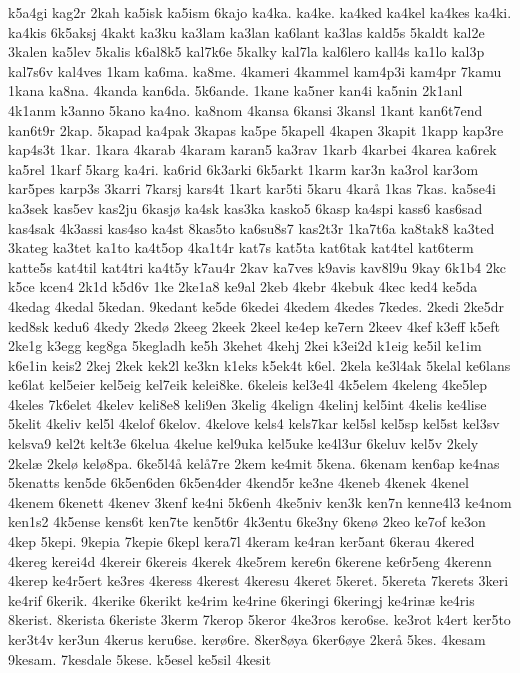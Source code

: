 {k5a4gi
kag2r
2kah
ka5isk
ka5ism
6kajo
ka4ka.
ka4ke.
ka4ked
ka4kel
ka4kes
ka4ki.
ka4kis
6k5aksj
4kakt
ka3ku
ka3lam
ka3lan
ka6lant
ka3las
kald5s
5kaldt
kal2e
3kalen
ka5lev
5kalis
k6al8k5
kal7k6e
5kalky
kal7la
kal6lero
kall4s
ka1lo
kal3p
kal7s6v
kal4ves
1kam
ka6ma.
ka8me.
4kameri
4kammel
kam4p3i
kam4pr
7kamu
1kana
ka8na.
4kanda
kan6da.
5k6ande.
1kane
ka5ner
kan4i
ka5nin
2k1anl
4k1anm
k3anno
5kano
ka4no.
ka8nom
4kansa
6kansi
3kansl
1kant
kan6t7end
kan6t9r
2kap.
5kapad
ka4pak
3kapas
ka5pe
5kapell
4kapen
3kapit
1kapp
kap3re
kap4s3t
1kar.
1kara
4karab
4karam
karan5
ka3rav
1karb
4karbei
4karea
ka6rek
ka5rel
1karf
5karg
ka4ri.
ka6rid
6k3arki
6k5arkt
1karm
kar3n
ka3rol
kar3om
kar5pes
karp3s
3karri
7karsj
kars4t
1kart
kar5ti
5karu
4karå
1kas
7kas.
ka5se4i
ka3sek
kas5ev
kas2ju
6kasjø
ka4sk
kas3ka
kasko5
6kasp
ka4spi
kass6
kas6sad
kas4sak
4k3assi
kas4so
ka4st
8kas5to
ka6su8s7
kas2t3r
1ka7t6a
ka8tak8
ka3ted
3kateg
ka3tet
ka1to
ka4t5op
4ka1t4r
kat7s
kat5ta
kat6tak
kat4tel
kat6term
katte5s
kat4til
kat4tri
ka4t5y
k7au4r
2kav
ka7ves
k9avis
kav8l9u
9kay
6k1b4
2kc
k5ce
kcen4
2k1d
k5d6v
1ke
2ke1a8
ke9al
2keb
4kebr
4kebuk
4kec
ked4
ke5da
4kedag
4kedal
5kedan.
9kedant
ke5de
6kedei
4kedem
4kedes
7kedes.
2kedi
2ke5dr
ked8sk
kedu6
4kedy
2kedø
2keeg
2keek
2keel
ke4ep
ke7ern
2keev
4kef
k3eff
k5eft
2ke1g
k3egg
keg8ga
5kegladh
ke5h
3kehet
4kehj
2kei
k3ei2d
k1eig
ke5il
ke1im
k6e1in
keis2
2kej
2kek
kek2l
ke3kn
k1eks
k5ek4t
k6el.
2kela
ke3l4ak
5kelal
ke6lans
ke6lat
kel5eier
kel5eig
kel7eik
kelei8ke.
6keleis
kel3e4l
4k5elem
4keleng
4ke5lep
4keles
7k6elet
4kelev
keli8e8
keli9en
3kelig
4kelign
4kelinj
kel5int
4kelis
ke4lise
5kelit
4keliv
kel5l
4kelof
6kelov.
4kelove
kels4
kels7kar
kel5sl
kel5sp
kel5st
kel3sv
kelsva9
kel2t
kelt3e
6kelua
4kelue
kel9uka
kel5uke
ke4l3ur
6keluv
kel5v
2kely
2kelæ
2kelø
kelø8pa.
6ke5l4å
kelå7re
2kem
ke4mit
5kena.
6kenam
ken6ap
ke4nas
5kenatts
ken5de
6k5en6den
6k5en4der
4kend5r
ke3ne
4keneb
4kenek
4kenel
4kenem
6kenett
4kenev
3kenf
ke4ni
5k6enh
4ke5niv
ken3k
ken7n
kenne4l3
ke4nom
ken1s2
4k5ense
kens6t
ken7te
ken5t6r
4k3entu
6ke3ny
6kenø
2keo
ke7of
ke3on
4kep
5kepi.
9kepia
7kepie
6kepl
kera7l
4keram
ke4ran
ker5ant
6kerau
4kered
4kereg
kerei4d
4kereir
6kereis
4kerek
4ke5rem
kere6n
6kerene
ke6r5eng
4kerenn
4kerep
ke4r5ert
ke3res
4keress
4kerest
4keresu
4keret
5keret.
5kereta
7kerets
3keri
ke4rif
6kerik.
4kerike
6kerikt
ke4rim
ke4rine
6keringi
6keringj
ke4rinæ
ke4ris
8kerist.
8kerista
6keriste
3kerm
7kerop
5keror
4ke3ros
kero6se.
ke3rot
k4ert
ker5to
ker3t4v
ker3un
4kerus
keru6se.
kerø6re.
8ker8øya
6ker6øye
2kerå
5kes.
4kesam
9kesam.
7kesdale
5kese.
k5esel
ke5sil
4kesit
}
